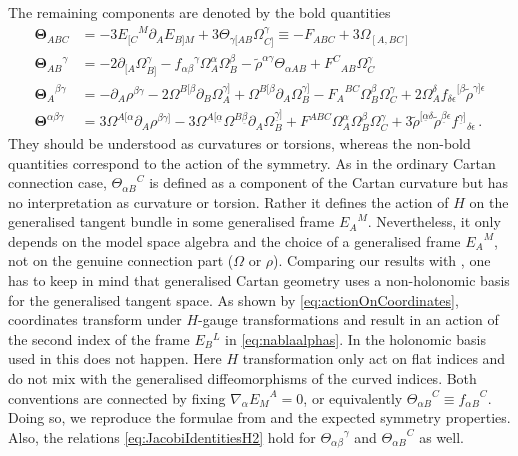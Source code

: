 \documentclass[11pt,a4paper]{article}
\numberwithin{equation}{section}
\begin{document}
The remaining components are denoted by the bold quantities 
\begin{align} 
	{\mathbf{\Theta}}_{ABC} &= - 3 {E_{[C}}^M \partial_A E_{B]M} + 3 \Theta_{\gamma [AB} \Omega_{C]}^\gamma \equiv - F_{ABC} + 3 \Omega_{[A,BC]}  \label{eq:GeneralisedCartanCurvatureExplicit} \\
	{\mathbf{\Theta}_{AB}}^\gamma &= - 2 \partial_{[A} \Omega_{B]}^\gamma - {f_{\alpha \beta}}^\gamma \Omega_A^\alpha \Omega_B^\beta - \tilde{\rho}^{ \alpha \gamma } \Theta_{\alpha AB} + {F^C}_{AB} \Omega_C^\gamma \nonumber \\
	{{\mathbf{\Theta}_A}^{\beta \gamma}} &= - \partial_A \rho^{\beta \gamma} - 2 \Omega^{B [{\beta} } \partial_B \Omega^{{\gamma}]}_A + \Omega^{B [{\beta}} \partial_A \Omega^{{\gamma}]}_B - {F_A}^{BC} \Omega_B^\beta \Omega_C^\gamma + 2 \Omega^{\delta }_A {f_{\delta \epsilon}}^{[\beta} \tilde{\rho}^{{\gamma}] \epsilon} \nonumber \\
	{\mathbf{\Theta}^{\alpha \beta \gamma}} &= 3 \Omega^{A [\alpha} \partial_A \rho^{\beta \gamma]} - 3 \Omega^{A[\underline{\alpha}} \Omega^{B \underline{\beta	}} \partial_A \Omega^{\underline{\gamma}]}_B + F^{ABC} \Omega_A^\alpha \Omega_B^\beta \Omega_C^\gamma + 3 \tilde{\rho}^{[\underline{\alpha}\delta} \tilde{\rho}^{\underline{\beta} \epsilon} f^{\underline{\gamma}]}{}_{\delta \epsilon}\,. \nonumber
\end{align}
They should be understood as curvatures or torsions, whereas the non-bold quantities correspond to the action of the symmetry. As in the ordinary Cartan connection case, ${\Theta_{\alpha B}}^C$ is defined as a component of the Cartan curvature but has no interpretation as curvature or torsion. Rather it defines the action of $H$ on the generalised tangent bundle in some generalised frame ${E_A}^M$. Nevertheless, it only depends on the model space algebra and the choice of a generalised frame ${E_A}^M$, not on the genuine connection part ($\Omega$ or $\rho$). Comparing our results with  \cite{Butter:2022iza}, one has to keep in mind that generalised Cartan geometry uses a non-holonomic basis for the generalised tangent space. As shown by \eqref{eq:actionOnCoordinates},  coordinates transform under $H$-gauge transformations and result in an action of the second index of the frame $E_B{}^L$ in \eqref{eq:nablaalphas}. In the holonomic basis used in \cite{Butter:2022iza} this does not happen. Here $H$ transformation only act on flat indices and do not mix with the generalised diffeomorphisms of the curved indices. Both conventions are connected by fixing $\nabla_\alpha {E_M}^A = 0$, or equivalently ${\Theta_{\alpha B}}^C \equiv {f_{\alpha B}}^C$. Doing so, we reproduce the formulae from \cite{Butter:2022iza} and the expected symmetry properties. Also, the relations \eqref{eq:JacobiIdentitiesH2} hold for ${\Theta_{\alpha \beta}}^\gamma$ and ${\Theta_{\alpha B}}^C$ as well.
\end{document}

